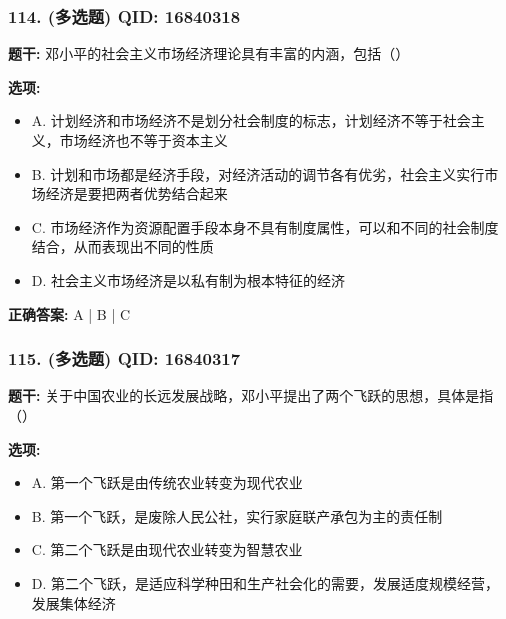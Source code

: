 \documentclass[12pt,UTF8]{ctexart}
\begin{document}
\subsubsection*{114. (多选题) \small QID: 16840318}

\textbf{题干:}
邓小平的社会主义市场经济理论具有丰富的内涵，包括（）

\textbf{选项:}
\begin{itemize}[leftmargin=*]

  \item A. 计划经济和市场经济不是划分社会制度的标志，计划经济不等于社会主义，市场经济也不等于资本主义

  \item B. 计划和市场都是经济手段，对经济活动的调节各有优劣，社会主义实行市场经济是要把两者优势结合起来

  \item C. 市场经济作为资源配置手段本身不具有制度属性，可以和不同的社会制度结合，从而表现出不同的性质

  \item D. 社会主义市场经济是以私有制为根本特征的经济

\end{itemize}

\textbf{正确答案:}
A | B | C

\vspace{0.3em}\hrulefill\vspace{0.7em}

\subsubsection*{115. (多选题) \small QID: 16840317}

\textbf{题干:}
关于中国农业的长远发展战略，邓小平提出了两个飞跃的思想，具体是指（）

\textbf{选项:}
\begin{itemize}[leftmargin=*]

  \item A. 第一个飞跃是由传统农业转变为现代农业

  \item B. 第一个飞跃，是废除人民公社，实行家庭联产承包为主的责任制

  \item C. 第二个飞跃是由现代农业转变为智慧农业

  \item D. 第二个飞跃，是适应科学种田和生产社会化的需要，发展适度规模经营，发展集体经济

\end{itemize}
\end{document}
